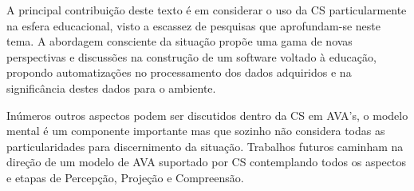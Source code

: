 \documentclass[12pt]{article}
\begin{document}
A principal contribuição deste texto é em considerar o uso da CS particularmente na esfera educacional, visto a escassez de pesquisas que aprofundam-se neste tema. A abordagem consciente da situação propõe uma gama de novas perspectivas e discussões na construção de um software voltado à educação, propondo automatizações no processamento dos dados adquiridos e na significância destes dados para o ambiente.  

Inúmeros outros aspectos podem ser discutidos dentro da CS em AVA's, o modelo mental é um componente importante mas que sozinho não considera todas as particularidades para discernimento da situação. Trabalhos futuros caminham na direção de um modelo de AVA suportado por CS contemplando todos os aspectos e etapas de Percepção, Projeção e Compreensão.



\end{document}
